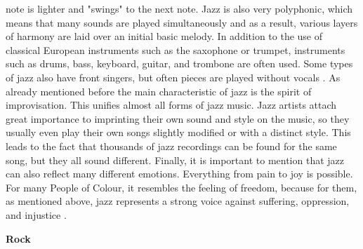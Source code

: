 note is lighter and "swings" to the next note.
Jazz is also very polyphonic, which means that many sounds are played simultaneously and as a result,
various layers of harmony are laid over an initial basic melody.
In addition to the use of classical European instruments such as the saxophone or trumpet,
instruments such as drums, bass, keyboard, guitar, and trombone are often used.
Some types of jazz also have front singers, but often pieces are played without vocals \cite{2020MasterclassJazz}.
As already mentioned before the main characteristic of jazz is
the spirit of improvisation. This unifies almost all forms of jazz music.
Jazz artists attach great importance to imprinting their own sound and style on the music,
so they usually even play their own songs slightly modified or with a distinct style.
This leads to the fact that thousands of jazz recordings can be found for the same song,
but they all sound different.
Finally, it is important to mention that jazz can also reflect many different emotions.
Everything from pain to joy is possible. For many People of Colour, it resembles the feeling of freedom,
because for them, as mentioned above, jazz represents a strong voice against suffering, oppression,
and injustice \cite{MusicalDictJazz}.

\textbf{Rock}

